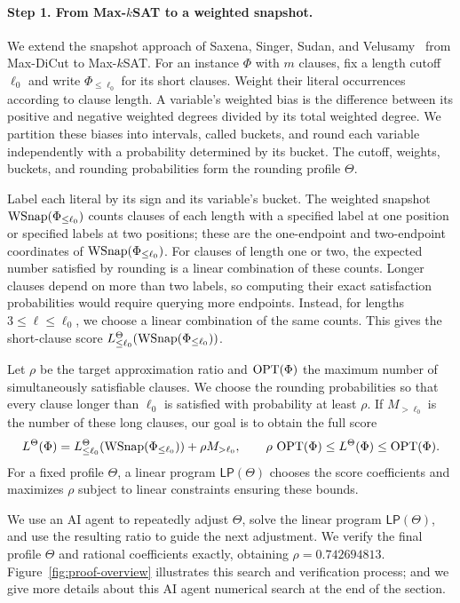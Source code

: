 \paragraph{Step 1. From Max-$k$SAT to a weighted snapshot.}
We extend the snapshot approach of Saxena, Singer, Sudan, and Velusamy~\cite{saxena2023improved} from Max-DiCut to Max-$k$SAT. For an instance $\Phi$ with $m$ clauses, fix a length cutoff $\ell_0$ and write $\Phi_{\le\ell_0}$ for its short clauses. Weight their literal occurrences according to clause length. A variable's weighted bias is the difference between its positive and negative weighted degrees divided by its total weighted degree. We partition these biases into intervals, called buckets, and round each variable independently with a probability determined by its bucket. The cutoff, weights, buckets, and rounding probabilities form the rounding profile $\Theta$.

Label each literal by its sign and its variable's bucket. The weighted snapshot $\operatorname{WSnap}(\Phi_{\le\ell_0})$ counts clauses of each length with a specified label at one position or specified labels at two positions; these are the  one-endpoint and two-endpoint coordinates of $\operatorname{WSnap}(\Phi_{\le\ell_0})$. For clauses of length one or two, the expected number satisfied by rounding is a linear combination of these counts. Longer clauses depend on more than two labels, so computing their exact satisfaction probabilities would require querying more endpoints. Instead, for lengths $3\le\ell\le\ell_0$, we choose a linear combination of the same counts. This gives the short-clause score $L_{\le\ell_0}^\Theta(\operatorname{WSnap}(\Phi_{\le\ell_0}))$.

Let $\rho$ be the target approximation ratio and $\operatorname{OPT}(\Phi)$ the maximum number of simultaneously satisfiable clauses. We choose the rounding probabilities so that every clause longer than $\ell_0$ is satisfied with probability at least $\rho$. If $M_{>\ell_0}$ is the number of these long clauses, our goal is to obtain the full score
\[
L^\Theta(\Phi)=L_{\le\ell_0}^\Theta(\operatorname{WSnap}(\Phi_{\le\ell_0}))+\rho M_{>\ell_0},
\qquad
\rho\,\operatorname{OPT}(\Phi)\le L^\Theta(\Phi)\le\operatorname{OPT}(\Phi).
\]
For a fixed profile $\Theta$, a linear program $\mathsf{LP}(\Theta)$  chooses the score coefficients and maximizes $\rho$ subject to linear constraints ensuring these bounds. 



We use 
an AI agent to  repeatedly adjust $\Theta$, solve the linear program $\mathsf{LP}(\Theta)$, and use the resulting ratio to guide the next adjustment. We verify the final profile $\Theta$ and  rational coefficients exactly, obtaining $\rho=0.742694813$. Figure~\ref{fig:proof-overview} illustrates this search and verification process; and we give more details about this AI agent numerical search at the end of the section.

